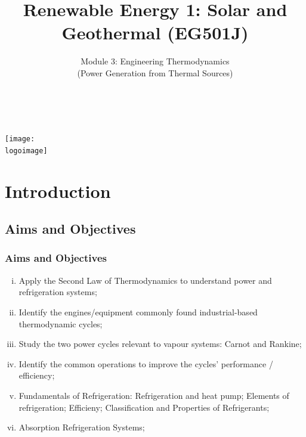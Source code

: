 \documentclass[10pt,compress,handout,ignorenonframetext]{beamer}
\institute{School of Engineering}
\title{Renewable Energy 1: Solar and Geothermal (EG501J)}
\subtitle{Module 3: Engineering Thermodynamics \\ (Power Generation from Thermal Sources)}
\date[]{}
\author[\shortname]{%
  \fullname\\\ttfamily{\emailaddress}
}
\newcommand{\logoimage}{../FigBanner/UoAHorizBanner}
\begin{document}
\begin{frame}
  \titlepage
  \vfill%
  \begin{center}
    \texttt{[image: \\logoimage]}
  \end{center}
\end{frame}





\section{Introduction}

 \subsection{Aims and Objectives}
   \begin{frame}
     \frametitle{Aims and Objectives}
     \begin{enumerate}[(i)]
       \item <1-> Apply the Second Law of Thermodynamics to understand power and refrigeration systems;
       \item <1-> Identify the engines/equipment commonly found industrial-based thermodynamic cycles; 
       \item <1-> Study the two power cycles relevant to vapour systems: Carnot and Rankine; 
       \item <1-> Identify the common operations to improve the cycles' performance / efficiency;
       \item <1-> Fundamentals of Refrigeration: Refrigeration and heat pump; Elements of refrigeration; Efficieny; Classification and Properties of Refrigerants;
       \item <1-> Absorption Refrigeration Systems;
 \end{enumerate}
   \end{frame}
\end{document}
